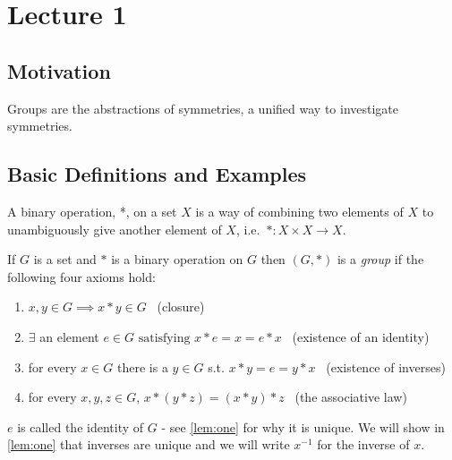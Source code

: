 
\hypertarget{lecture-1}{%
\section{Lecture 1}\label{lecture-1}}

\hypertarget{motivation}{%
\subsection{Motivation}\label{motivation}}

Groups are the abstractions of symmetries, a unified way to investigate symmetries.

\hypertarget{basic-definitions-and-examples}{%
\subsection{Basic Definitions and Examples}\label{basic-definitions-and-examples}}

A binary operation, *, on a set \(X\) is a way of combining two elements of \(X\) to unambiguously give another element of \(X\),
i.e.~\(*: X \times X \to X\).

\begin{definition}

If \(G\) is a set and \(*\) is a binary operation on \(G\) then \((G, *)\) is a \emph{group} if the following four axioms hold:

\begin{enumerate}
\def\labelenumi{\arabic{enumi}.}
\tightlist
\item
  \(x, y \in G \implies x * y \in G\) \hfill~{(closure)}
\item
  \(\exists\) an element \(e \in G \text{ satisfying } x * e = x = e * x\) \hfill~{(existence of an identity)}
\item
  for every \(x \in G\) there is a \(y \in G\) s.t. \(x * y = e = y * x\) \hfill~{(existence of inverses)}
\item
  for every \(x, y, z \in G\), \(x * (y * z) = (x * y) * z\) \hfill~{(the associative law)}
\end{enumerate}

\end{definition}

\begin{remark}
\(e\) is called the identity of \(G\) - see \ref{lem:one} for why it is unique.
We will show in \ref{lem:one} that inverses are unique and we will write \(x^{-1}\) for the inverse of \(x\).
\end{remark}

